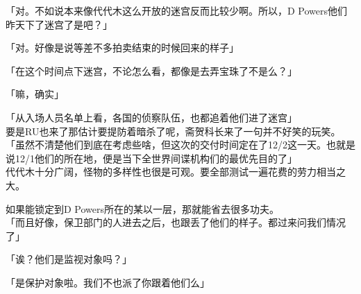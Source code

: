「对。不如说本来像代代木这么开放的迷宫反而比较少啊。所以，D Powers他们昨天下了迷宫了是吧？」

「对。好像是说等差不多拍卖结束的时候回来的样子」

「在这个时间点下迷宫，不论怎么看，都像是去弄宝珠了不是么？」

「嘛，确实」

「从入场人员名单上看，各国的侦察队伍，也都追着他们进了迷宫」\\

要是RU也来了那估计要提防着暗杀了呢，斋贺科长来了一句并不好笑的玩笑。\\

「虽然不清楚他们到底在考虑些啥，但这次的交付时间定在了12/2这一天。也就是说12/1他们的所在地，便是当下全世界间谍机构们的最优先目的了」\\

代代木十分广阔，怪物的多样性也很是可观。要全部测试一遍花费的劳力相当之大。

如果能锁定到D Powers所在的某以一层，那就能省去很多功夫。\\

「而且好像，保卫部门的人进去之后，也跟丢了他们的样子。都过来问我们情况了」

「诶？他们是监视对象吗？」

「是保护对象啦。我们不也派了你跟着他们么」\\

